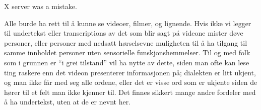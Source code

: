 \documentclass{../../myassignment}
\begin{document}
\begin{answer}
\begin{description}[style=nextline]
				X server was a mistake. 

			\item [Tekst video]
				Alle burde ha rett til å kunne se videoer, filmer, og lignende. Hvis ikke vi legger til undertekst eller transcriptions av det som blir sagt pá videone mister døve personer, eller personer med nedsatt hørselsevne muligheten til å ha tilgang til samme innholdet personer uten sensorielle funskjonshemmelser. Til og med folk som i grunnen er ``i grei tilstand'' vil ha nytte av dette, siden man ofte kan lese ting raskere enn det videon presenterer informasjonen på; dialekten er litt ukjent, og man ikke får med seg alle ordene, eller det er visse ord som er ukjente siden de hører til et felt man ikke kjenner til. Det finnes sikkert mange andre fordeler med å ha undertekst, uten at de er nevnt her.

		\end{description}
	\end{answer}
\end{document}
